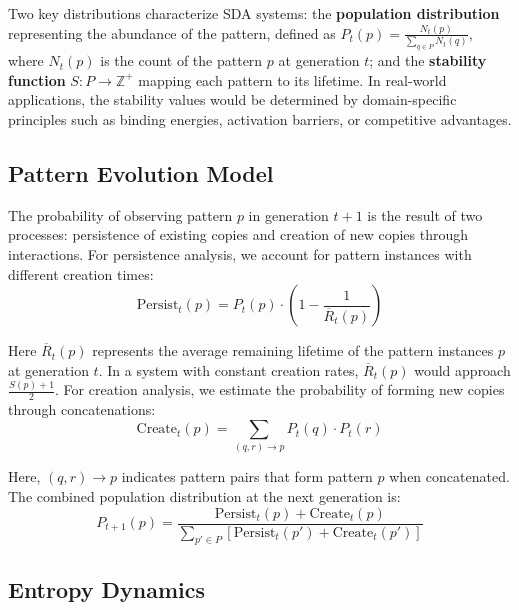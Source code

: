 \documentclass[preprint,12pt]{elsarticle}
\begin{document}
Two key distributions characterize SDA systems: the \textbf{population distribution} representing the abundance of the pattern, defined as \( P_t(p) = \frac{N_t(p)}{\sum_{q \in P} N_t(q)} \), where \( N_t(p) \) is the count of the pattern \( p \) at generation \( t \); and the \textbf{stability function} \( S: P \rightarrow \mathbb{Z}^{+} \) mapping each pattern to its lifetime. In real-world applications, the stability values would be determined by domain-specific principles such as binding energies, activation barriers, or competitive advantages.

\subsection{Pattern Evolution Model}

The probability of observing pattern \(p\) in generation \(t+1\) is the result of two processes: persistence of existing copies and creation of new copies through interactions. For persistence analysis, we account for pattern instances with different creation times:
\begin{equation}
\label{eq:persist-term}
\mathrm{Persist}_t(p) = P_t(p) \cdot \left(1 - \frac{1}{\overline{R}_t(p)}\right)
\end{equation}

Here \(\overline{R}_t(p)\) represents the average remaining lifetime of the pattern instances \(p\) at generation \(t\). In a system with constant creation rates, \(\overline{R}_t(p)\) would approach \(\frac{S(p)+1}{2}\). For creation analysis, we estimate the probability of forming new copies through concatenations:
\begin{equation}
\label{eq:create-term}
\mathrm{Create}_t(p) = \sum_{(q,r) \to p} P_t(q) \cdot P_t(r)
\end{equation}

Here, \((q,r) \to p\) indicates pattern pairs that form pattern \(p\) when concatenated. The combined population distribution at the next generation is:
\begin{equation}
\label{eq:full-ba-update}
P_{t+1}(p) = \frac{
  \mathrm{Persist}_t(p) + \mathrm{Create}_t(p)
}{
  \sum_{p' \in P} 
  \left[
    \mathrm{Persist}_t(p') + \mathrm{Create}_t(p')
  \right]
}
\end{equation}

\subsection{Entropy Dynamics}
\end{document}

